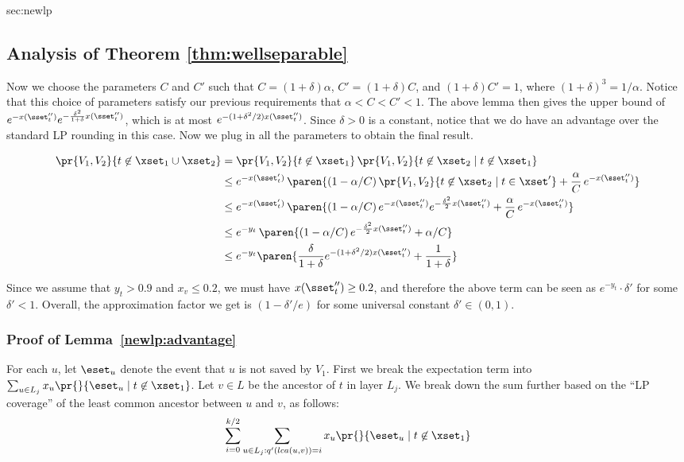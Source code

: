 \begin{appendixextra}{sec:newlp}{\subsection{Analysis of Theorem \ref{thm:wellseparable}}}
Now we choose the parameters $C$ and $C'$ such that $C = (1+\delta) \alpha$, $C' = (1+\delta)C$, and $(1+\delta)C' = 1$, where $(1+\delta)^3 = 1/\alpha$.
Notice that this choice of parameters satisfy our previous requirements that $\alpha < C < C' <1$. 
The above lemma then gives the upper bound of $e^{-x(\sset''_t)} e^{-\frac{\delta^2}{1+\delta} x(\sset''_t)}$, which is at most $e^{-(1+\delta^2/2) x(\sset''_t)}$.  
Since $\delta>0$ is a constant, notice that we do have an advantage over the standard LP rounding in this case.
Now we plug in all the parameters to obtain the final result.   

\begin{align*}
\pr{V_1, V_2}{t \not \in \xset_1 \cup \xset_2} 
&= \pr{V_1, V_2}{t \not\in \xset_1}\,\pr{V_1, V_2}{t \not \in \xset_2 \mid t \not\in \xset_1} \\
&\leq e^{-x(\sset'_t)}\,\paren{(1-\alpha/C) \, \pr{V_1, V_2}{t \not \in \xset_2 \mid t \in \xset'} + \frac{\alpha}{C} \,e^{-x(\sset''_t)}} \\
&\leq e^{-x(\sset'_t)}\,
        \paren{(1-\alpha/C) \, e^{-x(\sset''_t)} e^{-\frac{\delta^2}{2} x(\sset''_t)}  + \frac{\alpha}{C} \, e^{-x(\sset''_t)}} \\
&\leq e^{-y_t}\,\paren{(1-\alpha/C) \, e^{- \frac{\delta^2}{2}x(\sset''_t) } + \alpha/C } \\
& \leq  e^{-y_t} \paren{\frac{\delta}{1+\delta} e^{-(1+\delta^2/2)x(\sset''_t)} + \frac{1}{1+\delta}} 
\end{align*}

Since we assume that $y_t > 0.9$ and $x_v \leq 0.2$, we must have $x(\sset''_t) \geq 0.2$,
 and therefore the above term can be seen as $e^{-y_t} \cdot \delta'$ for some $\delta' <1$.
Overall, the approximation factor we get is $(1-\delta'/e)$ for some universal constant $\delta' \in (0,1)$.  

\subsubsection{Proof of Lemma~\ref{newlp:advantage}}
For each $u$, let $\eset_u$ denote the event that $u$ is not saved by $V_1$.  
First we break the expectation term into $\sum_{u \in L_j} x_u \pr{}{\eset_u \mid t \not \in \xset_1}$.  
Let $v \in L$ be the ancestor of $t$ in layer $L_j$.  
We break down the sum further based on the ``LP coverage'' of the least common ancestor between $u$ and $v$, as follows: 
\[\sum_{i=0}^{k/2} \sum_{u\in L_j: q'(lca(u,v))=i} x_u \pr{}{\eset_u \mid t \not\in \xset_1} \]


\end{appendixextra}
